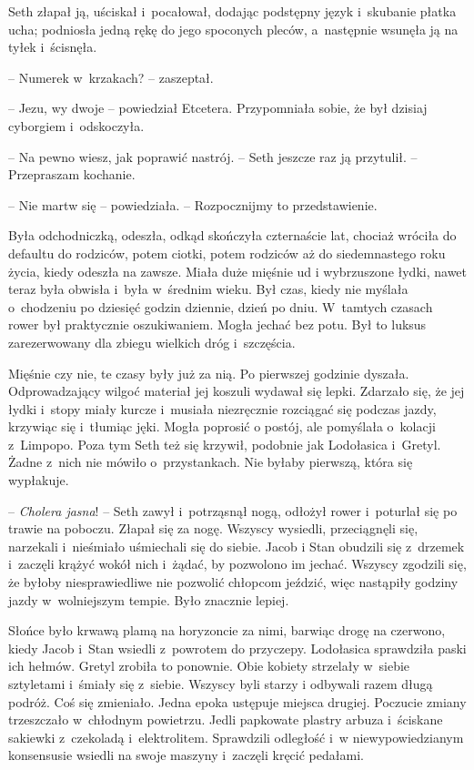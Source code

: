 \documentclass[oneside,polish,11pt,sfheadings]{mwbk}
\begin{document}
Seth złapał ją, uściskał i~pocałował, dodając podstępny język i~skubanie
płatka ucha; podniosła jedną rękę do jego spoconych pleców, a~następnie
wsunęła ją na tyłek i~ścisnęła.

-- Numerek w~krzakach? -- zaszeptał.

-- Jezu, wy dwoje -- powiedział Etcetera. Przypomniała sobie, że był
dzisiaj cyborgiem i~odskoczyła.

-- Na pewno wiesz, jak poprawić nastrój. -- Seth jeszcze raz ją przytulił.
-- Przepraszam kochanie.

-- Nie martw się -- powiedziała. -- Rozpocznijmy to przedstawienie.

Była odchodniczką, odeszła, odkąd skończyła czternaście lat, chociaż
wróciła do defaultu do rodziców, potem ciotki, potem rodziców aż do
siedemnastego roku życia, kiedy odeszła na zawsze. Miała duże mięśnie ud
i wybrzuszone łydki, nawet teraz była obwisła i~była w~średnim wieku.
Był czas, kiedy nie myślała o~chodzeniu po dziesięć godzin dziennie,
dzień po dniu. W~tamtych czasach rower był praktycznie oszukiwaniem.
Mogła jechać bez potu. Był to luksus zarezerwowany dla zbiegu wielkich
dróg i~szczęścia.

Mięśnie czy nie, te czasy były już za nią. Po pierwszej godzinie
dyszała. Odprowadzający wilgoć materiał jej koszuli wydawał się lepki.
Zdarzało się, że jej łydki i~stopy miały kurcze i~musiała niezręcznie
rozciągać się podczas jazdy, krzywiąc się i~tłumiąc jęki. Mogła poprosić
o postój, ale pomyślała o~kolacji z~Limpopo. Poza tym Seth też się
krzywił, podobnie jak Lodołasica i~Gretyl. Żadne z~nich nie mówiło o~przystankach. Nie byłaby pierwszą, która się wypłakuje.

-- \textit{Cholera jasna}! -- Seth zawył i~potrząsnął nogą, odłożył rower i~poturlał się po trawie na poboczu. Złapał się za nogę. Wszyscy wysiedli,
przeciągnęli się, narzekali i~nieśmiało uśmiechali się do siebie. Jacob
i Stan obudzili się z~drzemek i~zaczęli krążyć wokół nich i~żądać, by
pozwolono im jechać. Wszyscy zgodzili się, że byłoby niesprawiedliwe nie
pozwolić chłopcom jeździć, więc nastąpiły godziny jazdy w~wolniejszym
tempie. Było znacznie lepiej.

Słońce było krwawą plamą na horyzoncie za nimi, barwiąc drogę na
czerwono, kiedy Jacob i~Stan wsiedli z~powrotem do przyczepy. Lodołasica
sprawdziła paski ich hełmów. Gretyl zrobiła to ponownie. Obie kobiety
strzelały w~siebie sztyletami i~śmiały się z~siebie. Wszyscy byli starzy
i odbywali razem długą podróż. Coś się zmieniało. Jedna epoka ustępuje
miejsca drugiej. Poczucie zmiany trzeszczało w~chłodnym powietrzu. Jedli
papkowate plastry arbuza i~ściskane sakiewki z~czekoladą i~elektrolitem.
Sprawdzili odległość i~w niewypowiedzianym konsensusie wsiedli na swoje
maszyny i~zaczęli kręcić pedałami.
\end{document}
